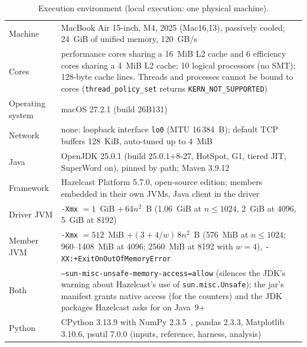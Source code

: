 \documentclass[11pt,a4paper]{article}
\begin{document}
\begin{table}[htbp]
\centering\small
\caption{Execution environment (local execution: one physical machine).}
\label{tab:env}
\begin{tabular}{>{\raggedright}p{3.4cm}>{\raggedright\arraybackslash}p{11.0cm}}
\toprule
Machine & MacBook Air 15-inch, M4, 2025 (Mac16,13), passively cooled; 24~GiB of
unified memory, 120~GB/s~\cite{applem4} \\
Cores & 4 performance cores sharing a 16~MiB L2 cache and 6 efficiency cores
sharing a 4~MiB L2 cache; 10 logical processors (no SMT); 128-byte cache lines.
Threads and processes cannot be bound to cores
(\texttt{thread\_policy\_set} returns \texttt{KERN\_NOT\_SUPPORTED}) \\
Operating system & macOS 27.2.1 (build 26B131) \\
Network & none: loopback interface \texttt{lo0} (MTU 16\,384~B); default TCP
buffers 128~KiB, auto-tuned up to 4~MiB \\
Java & OpenJDK 25.0.1 (build 25.0.1+8-27, HotSpot, G1, tiered JIT, SuperWord
on), pinned by path; Maven 3.9.12 \\
Framework & Hazelcast Platform 5.7.0, open-source edition; members embedded in
their own JVMs, Java client in the driver \\
Driver JVM & \texttt{-Xmx} $=1$~GiB $+\,64n^2$~B (1.06~GiB at $n\le1024$,
2~GiB at 4096, 5~GiB at 8192) \\
Member JVM & \texttt{-Xmx} $=512$~MiB $+(3+4/w)\,8n^2$~B (576~MiB at
$n\le1024$; 960--1408~MiB at 4096; 2560~MiB at 8192 with $w=4$),
\texttt{-XX:+ExitOnOutOfMemoryError} \\
Both & \texttt{--sun-misc-unsafe-memory-access=allow} (silences the JDK's
warning about Hazelcast's use of \texttt{sun.misc.Unsafe}); the jar's manifest
grants native access (for the counters) and the JDK packages Hazelcast asks for
on Java~9+ \\
Python & CPython 3.13.9 with NumPy 2.3.5~\cite{harris2020}, pandas 2.3.3,
Matplotlib 3.10.6, psutil 7.0.0 (inputs, reference, harness, analysis) \\
\bottomrule
\end{tabular}
\end{table}
\end{document}
